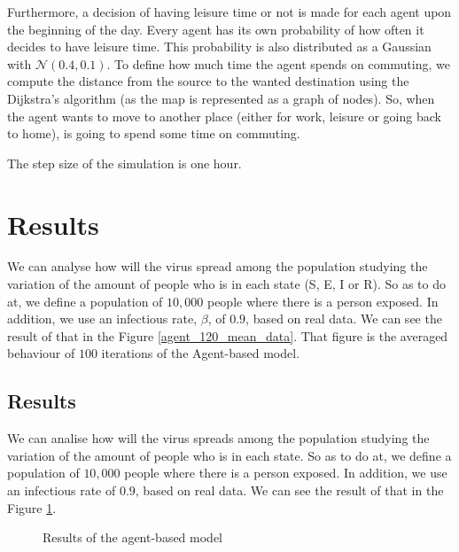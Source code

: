 \documentclass[a4paper]{article}
\begin{document}
Furthermore, a decision of having leisure time or not is made for each agent upon the beginning of the day. Every agent has its own probability of how often it decides to have leisure time. This probability is also distributed as a Gaussian with $\mathcal{N}(0.4,0.1)$. To define how much time the agent spends on commuting, we compute the distance from the source to the wanted destination using the Dijkstra's algorithm (as the map is represented as a graph of nodes). So, when the agent wants to move to another place (either for work, leisure or going back to home), is going to spend some time on commuting.

The step size of the simulation is one hour.

\section{Results}
We can analyse how will the virus spread among the population studying the variation of the amount of people who is in each state (S, E, I or R). So as to do at, we define a population of $10,000$ people where there is a person exposed. In addition, we use an infectious rate, $\beta$, of $0.9$, based on real data. We can see the result of that in the Figure \ref{agent_120_mean_data}. That figure is the averaged behaviour of $100$ iterations of the Agent-based model.

\subsection{Results}
We can analise how will the virus spreads among the population studying the variation of the amount of people who is in each state. So as to do at, we define a population of $10,000$ people where there is a person exposed. In addition, we use an infectious rate of $0.9$, based on real data. We can see the result of that in the Figure \ref{agent_120_1}.

\begin{figure}[H] 
 \centering
 \caption{Results of the agent-based model}
 \label{agent_120_1}
 \end{figure}
\end{document}

